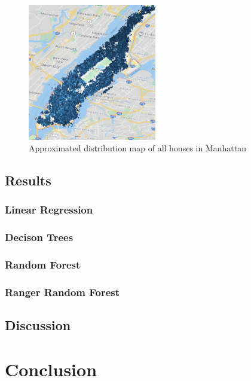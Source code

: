 \documentclass{FR16}
\begin{document}
\begin{figure}[H]
\centering
\includegraphics[width=0.5\textwidth]{figures/figure4.PNG} 
\caption{\label{fig:4}  Approximated distribution map of all houses in Manhattan }
\end{figure}



\subsection{Results}

\subsubsection{Linear Regression}
 
  \subsubsection{Decison Trees}

 \subsubsection{Random Forest}

 \subsubsection{Ranger Random Forest}


\subsection{Discussion}

\section{Conclusion}
\end{document}
